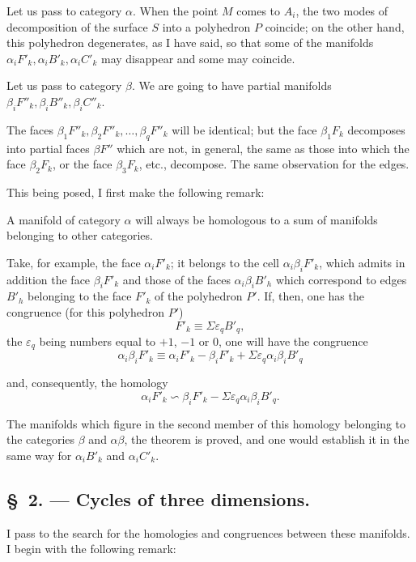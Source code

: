 \documentclass{article}
\begin{document}
Let us pass to category $\alpha$. When the point $M$ comes to $A_{i}$, the two modes of decomposition of the surface $S$ into a polyhedron $P$ coincide; on the other hand, this polyhedron degenerates, as I have said, so that some of the manifolds $\alpha_{i}F'_{k}, \alpha_{i}B'_{k}, \alpha_{i}C'_{k}$ may disappear and some may coincide.

Let us pass to category $\beta$. We are going to have partial manifolds $\beta_{i}F''_{k}, \beta_{i}B''_{k}, \beta_{i}C''_{k}$.

The faces $\beta_{1}F''_{k}, \beta_{2}F''_{k}, \ldots, \beta_{q}F''_{k}$ will be identical; but the face $\beta_{1}F_{k}$ decomposes into partial faces $\beta F''$ which are not, in general, the same as those into which the face $\beta_{2}F_{k}$, or the face $\beta_{3}F_{k}$, etc., decompose. The same observation for the edges.

This being posed, I first make the following remark:

A manifold of category $\alpha$ will always be homologous to a sum of manifolds belonging to other categories.

Take, for example, the face $\alpha_{i}F'_{k}$; it belongs to the cell $\alpha_{i}\beta_{i}F'_{k}$, which admits in addition the face $\beta_{i}F'_{k}$ and those of the faces $\alpha_{i}\beta_{i}B'_{h}$ which correspond to edges $B'_{h}$ belonging to the face $F'_{k}$ of the polyhedron $P'$. If, then, one has the congruence (for this polyhedron $P'$)
\[ F'_{k} \equiv \Sigma \varepsilon_{q} B'_{q}, \]
the $\varepsilon_{q}$ being numbers equal to $+1$, $-1$ or 0, one will have the congruence
\[ \alpha_{i}\beta_{i}F'_{k} \equiv \alpha_{i}F'_{k} - \beta_{i}F'_{k} + \Sigma \varepsilon_{q} \alpha_{i}\beta_{i}B'_{q} \]

and, consequently, the homology
\[ \alpha_{i}F'_{k} \backsim \beta_{i}F'_{k} - \Sigma \varepsilon_{q} \alpha_{i}\beta_{i}B'_{q}. \]

The manifolds which figure in the second member of this homology belonging to the categories $\beta$ and $\alpha\beta$, the theorem is proved, and one would establish it in the same way for $\alpha_{i}B'_{k}$ and $\alpha_{i}C'_{k}$.

\subsection*{\S~2. --- Cycles of three dimensions.}

I pass to the search for the homologies and congruences between these manifolds. I begin with the following remark:
\end{document}
